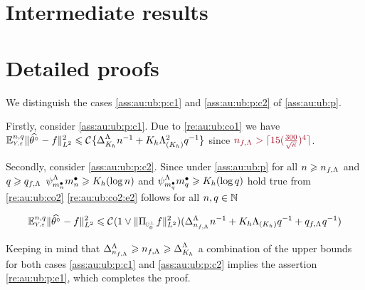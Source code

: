 %                                                                 
% 
%
\section{Intermediate results}

\section{Detailed proofs}

\begin{pro}
We distinguish the cases \ref{ass:au:ub:p:c1} and \ref{ass:au:ub:p:c2} of \cref{ass:au:ub:p}.

\medskip

Firstly, consider \ref{ass:au:ub:p:c1}.
Due to \cref{re:au:ub:co1} we have $\FuEx[\ssY,\ssE]{\rY,\rE}\VnormLp{\hxdf-\xdf}^2 \leq\cst{}\{\DipenSv[K_{\ydf}]\ssY^{-1}+K_{\ydf}\miSv[K_{\ydf}]^2\ssE^{-1}\}$ since  
$\dr\ssY_{\xdf,\iSv}>\ceil{15(\tfrac{300}{\sqrt{\cpen}})^4}$.

\medskip

Secondly, consider \ref{ass:au:ub:p:c2}. 
Since under \cref{ass:au:ub:p} for all $\ssY\geq\ssY_{\xdf,\iSv}$ and $\ssE\geq\ssE_{\xdf,\iSv}$ $\cmiSv[\sDi{\ssY}]\sDi{\ssY}\geq K_{\ydf}(\log\ssY)$ and $\cmiSv[\sDi{\ssE}]\sDi{\ssE}\geq K_{\ydf}(\log\ssE)$ hold true from \cref{re:au:ub:co2} \eqref{re:au:ub:co2:e2} follows for all $\ssY,\ssE\in\Nz$

\begin{equation*}
\FuEx[\ssY,\ssE]{\rY,\rE}\VnormLp{\hxdfPr[]-\xdf}^2\leq \cst{}(1\vee\VnormLp{\Proj[{\mHiH[0]^\perp}]\xdf}^2)(\DipenSv[\ssY_{\xdf,\iSv}]\ssY^{-1}+K_{\ydf}\miSv[K_{\ydf}]\ssE^{-1}+\ssE_{\xdf,\iSv}\ssE^{-1})
\end{equation*}

Keeping in mind that $\DipenSv[\ssY_{\xdf,\iSv}]\geq\ssY_{\xdf,\iSv}\geq\DipenSv[K_{\ydf}]$ a combination of the upper bounds for both cases \ref{ass:au:ub:p:c1} and \ref{ass:au:ub:p:c2} implies the assertion \eqref{re:au:ub:p:e1}, which completes the proof.
\end{pro}


